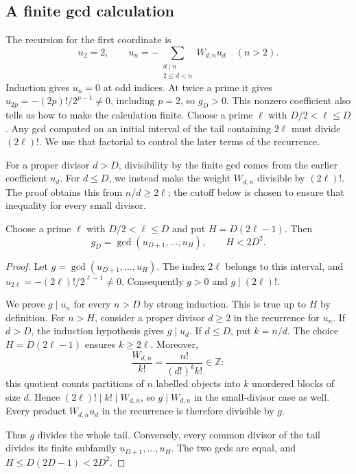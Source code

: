 \documentclass[11pt]{article}
\begin{document}
\subsection{A finite gcd calculation}\label{sec:finite-gcd}

The recursion for the first coordinate is
\[
 u_2=2,\qquad
 u_n=-\sum_{\substack{d\mid n\\2\le d<n}}W_{d,n}u_d\quad(n>2).
\]
Induction gives $u_n=0$ at odd indices. At twice a prime it gives
$u_{2p}=-(2p)!/2^{p-1}\ne0$, including $p=2$, so $g_D>0$.
This nonzero coefficient also tells us how to make the calculation finite.
Choose a prime $\ell$ with $D/2<\ell\le D$. Any gcd computed on an
initial interval of the tail containing $2\ell$ must divide $(2\ell)!$.
We use that factorial to control the later terms of the recurrence.

For a proper divisor $d>D$, divisibility by the finite gcd comes from
the earlier coefficient $u_d$. For $d\le D$, we instead make the
weight $W_{d,n}$ divisible by $(2\ell)!$. The proof obtains this from
$n/d\ge2\ell$; the cutoff below is chosen to ensure that inequality
for every small divisor.

\begin{theorem}
\label{res:finite-channel-moment-certificate}
Choose a prime $\ell$ with $D/2<\ell\le D$ and put $H=D(2\ell-1)$.
Then
\[
g_D=\gcd(u_{D+1},\ldots,u_H),\qquad H<2D^2.
\]
\end{theorem}

\begin{proof}
Let $g=\gcd(u_{D+1},\ldots,u_H)$. The index $2\ell$ belongs to this
interval, and $u_{2\ell}=-(2\ell)!/2^{\ell-1}\ne0$. Consequently
$g>0$ and $g\mid(2\ell)!$.

We prove $g\mid u_n$ for every $n>D$ by strong induction. This is true
up to $H$ by definition. For $n>H$, consider a proper divisor $d\ge2$
in the recurrence for $u_n$. If $d>D$, the induction hypothesis gives
$g\mid u_d$. If $d\le D$, put $k=n/d$. The choice
$H=D(2\ell-1)$ ensures $k\ge2\ell$. Moreover,
\[
 \frac{W_{d,n}}{k!}=\frac{n!}{(d!)^k k!}\in\mathbb Z:
\]
this quotient counts partitions of $n$ labelled objects into $k$
unordered blocks of size $d$. Hence $(2\ell)!\mid k!\mid W_{d,n}$,
so $g\mid W_{d,n}$ in the small-divisor case as well.
Every product $W_{d,n}u_d$ in the recurrence is therefore divisible
by $g$.

Thus $g$ divides the whole tail. Conversely, every common divisor of
the tail divides its finite subfamily $u_{D+1},\ldots,u_H$. The two
gcds are equal, and $H\le D(2D-1)<2D^2$.
\end{proof}
\end{document}

